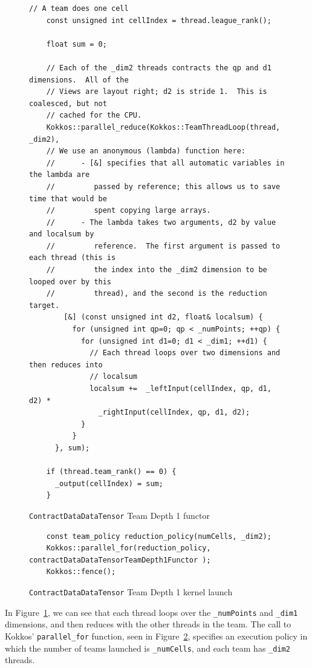 \begin{figure}[ht]
    \begin{lstlisting}[basicstyle=\tiny]
    // A team does one cell
    const unsigned int cellIndex = thread.league_rank();

    float sum = 0;
    
    // Each of the _dim2 threads contracts the qp and d1 dimensions.  All of the
    // Views are layout right; d2 is stride 1.  This is coalesced, but not
    // cached for the CPU.
    Kokkos::parallel_reduce(Kokkos::TeamThreadLoop(thread, _dim2),
    // We use an anonymous (lambda) function here:
    //      - [&] specifies that all automatic variables in the lambda are
    //         passed by reference; this allows us to save time that would be
    //         spent copying large arrays.
    //      - The lambda takes two arguments, d2 by value and localsum by
    //         reference.  The first argument is passed to each thread (this is
    //         the index into the _dim2 dimension to be looped over by this
    //         thread), and the second is the reduction target.
        [&] (const unsigned int d2, float& localsum) {
          for (unsigned int qp=0; qp < _numPoints; ++qp) {
            for (unsigned int d1=0; d1 < _dim1; ++d1) {
              // Each thread loops over two dimensions and then reduces into
              // localsum
              localsum +=  _leftInput(cellIndex, qp, d1, d2) *
                _rightInput(cellIndex, qp, d1, d2);
            }
          }
      }, sum);

    if (thread.team_rank() == 0) {
      _output(cellIndex) = sum;
    }
 \end{lstlisting}
\caption{\texttt{ContractDataDataTensor} Team Depth 1 functor
\label{lst:ContractDataDataTensorDepth1Functor}} 
\end{figure}

\begin{figure}[ht]
    \begin{lstlisting}
    const team_policy reduction_policy(numCells, _dim2);
    Kokkos::parallel_for(reduction_policy, contractDataDataTensorTeamDepth1Functor );
    Kokkos::fence();
 \end{lstlisting}
\caption{\texttt{ContractDataDataTensor} Team Depth 1 kernel launch
\label{lst:ContractDataDataTensorDepth1Call}} 
\end{figure}

In Figure~\ref{lst:ContractDataDataTensorDepth1Functor}, we can see that each
thread loops over the \texttt{\_numPoints} and \texttt{\_dim1} dimensions, and then
reduces with the other threads in the team.  The call to Kokkos'
\texttt{parallel\_for} function, seen in
Figure~\ref{lst:ContractDataDataTensorDepth1Call}, specifies an execution policy
in which the number of teams launched is \texttt{\_numCells}, and each team has
\texttt{\_dim2} threads.


